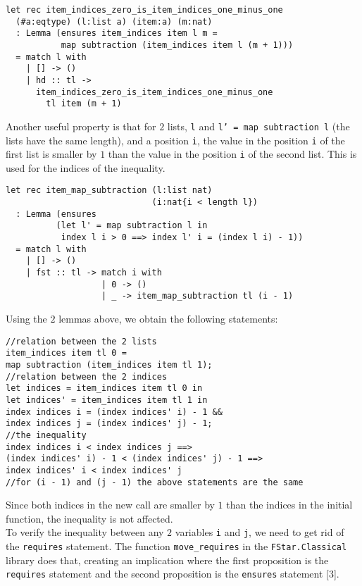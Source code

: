 \begin{verbatim}
let rec item_indices_zero_is_item_indices_one_minus_one 
  (#a:eqtype) (l:list a) (item:a) (m:nat)
  : Lemma (ensures item_indices item l m =
           map subtraction (item_indices item l (m + 1)))
  = match l with 
    | [] -> ()
    | hd :: tl -> 
      item_indices_zero_is_item_indices_one_minus_one 
        tl item (m + 1)
\end{verbatim}

Another useful property is that for \(2\) lists, \texttt{l} and \texttt{l' = map subtraction l} (the lists have the same length), and a position \texttt{i}, the value in the position \texttt{i} of the first list is smaller by \(1\) than the value in the position \texttt{i} of the second list. This is used for the indices of the inequality.

\begin{verbatim}
let rec item_map_subtraction (l:list nat) 
                             (i:nat{i < length l})
  : Lemma (ensures 
          (let l' = map subtraction l in
           index l i > 0 ==> index l' i = (index l i) - 1))
  = match l with 
    | [] -> ()
    | fst :: tl -> match i with  
                   | 0 -> ()
                   | _ -> item_map_subtraction tl (i - 1)
\end{verbatim}

Using the \(2\) lemmas above, we obtain the following statements:

\begin{verbatim}
//relation between the 2 lists
item_indices item tl 0 = 
map subtraction (item_indices item tl 1);
//relation between the 2 indices
let indices = item_indices item tl 0 in
let indices' = item_indices item tl 1 in
index indices i = (index indices' i) - 1 &&
index indices j = (index indices' j) - 1;
//the inequality
index indices i < index indices j ==>
(index indices' i) - 1 < (index indices' j) - 1 ==>
index indices' i < index indices' j
//for (i - 1) and (j - 1) the above statements are the same
\end{verbatim}

Since both indices in the new call are smaller by \(1\) than the indices in the initial function, the inequality is not affected. \\ 
\indent To verify the inequality between any \(2\) variables \texttt{i} and \texttt{j}, we need to get rid of the \texttt{requires} statement. The function \texttt{move\_requires} in the \texttt{FStar.Classical} library does that, creating an implication where the first proposition is the \texttt{requires} statement and the second proposition is the \texttt{ensures} statement [\(3\)].


